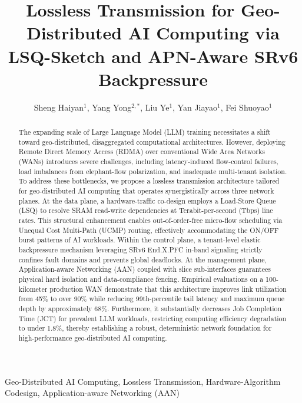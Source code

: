 \documentclass[a4paper]{jpconf}
\begin{document}
\title{Lossless Transmission for Geo-Distributed AI Computing via LSQ-Sketch and APN-Aware SRv6 Backpressure}


\author{Sheng Haiyan$^1$, Yang Yong$^{2,*}$, Liu Ye$^1$, Yan Jiayao$^1$, Fei Shuoyao$^1$}


\address{$^1$ Century College, Beijing University of Posts and Telecommunications, Beijing, 100876, China}
\address{$^2$ China Mobile Communications Group Beijing Co., Ltd., Beijing, 100032, China}


\begin{abstract}
The expanding scale of Large Language Model (LLM) training necessitates a shift toward geo-distributed, disaggregated computational architectures. However, deploying Remote Direct Memory Access (RDMA) over conventional Wide Area Networks (WANs) introduces severe challenges, including latency-induced flow-control failures, load imbalances from elephant-flow polarization, and inadequate multi-tenant isolation. To address these bottlenecks, we propose a lossless transmission architecture tailored for geo-distributed AI computing that operates synergistically across three network planes. At the data plane, a hardware-traffic co-design employs a Load-Store Queue (LSQ) to resolve SRAM read-write dependencies at Terabit-per-second (Tbps) line rates. This structural enhancement enables out-of-order-free micro-flow scheduling via Unequal Cost Multi-Path (UCMP) routing, effectively accommodating the ON/OFF burst patterns of AI workloads. Within the control plane, a tenant-level elastic backpressure mechanism leveraging SRv6 End.X.PFC in-band signaling strictly confines fault domains and prevents global deadlocks. At the management plane, Application-aware Networking (AAN) coupled with slice sub-interfaces guarantees physical hard isolation and data-compliance fencing. Empirical evaluations on a 100-kilometer production WAN demonstrate that this architecture improves link utilization from 45\% to over 90\% while reducing 99th-percentile tail latency and maximum queue depth by approximately 68\%. Furthermore, it substantially decreases Job Completion Time (JCT) for prevalent LLM workloads, restricting computing efficiency degradation to under 1.8\%, thereby establishing a robust, deterministic network foundation for high-performance geo-distributed AI computing.
\end{abstract}

 Geo-Distributed AI Computing, Lossless Transmission, Hardware-Algorithm Codesign, Application-aware Networking (AAN)
\end{document}
